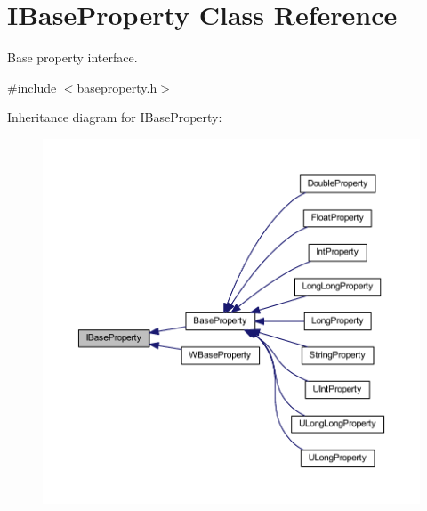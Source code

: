 \hypertarget{class_i_base_property}{\section{I\-Base\-Property Class Reference}
\label{class_i_base_property}
}


Base property interface.  




{\ttfamily \#include $<$baseproperty.\-h$>$}



Inheritance diagram for I\-Base\-Property\-:
\nopagebreak
\begin{figure}[H]
\begin{center}
\leavevmode
\includegraphics[width=350pt]{class_i_base_property__inherit__graph}
\end{center}
\end{figure}
